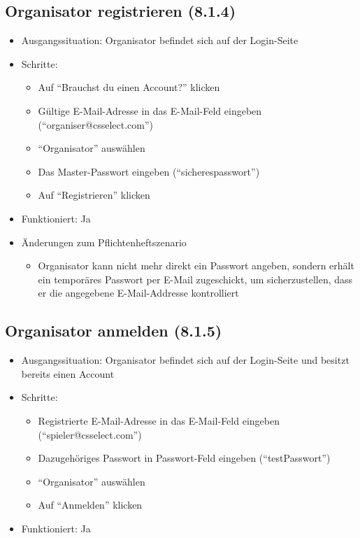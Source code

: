 \documentclass[a4paper]{scrreprt}
\begin{document}
            \subsection{Organisator registrieren (8.1.4)}
            \begin{itemize}
                \item Ausgangssituation: Organisator befindet sich auf der Login-Seite
                \item Schritte:
                    \begin{itemize}
                        \item Auf \enquote{Brauchst du einen Account?} klicken
                        \item Gültige E-Mail-Adresse in das E-Mail-Feld eingeben (\enquote{organiser@csselect.com})
                        \item \enquote{Organisator} auswählen
                        \item Das Master-Passwort eingeben (\enquote{sicherespasswort})
                        \item Auf \enquote{Registrieren} klicken
                    \end{itemize}
                \item Funktioniert: Ja
                \item Änderungen zum Pflichtenheftszenario
                \begin{itemize}
                    \item Organisator kann nicht mehr direkt ein Passwort angeben, sondern erhält ein temporäres Passwort per E-Mail zugeschickt,
                    um sicherzustellen, dass er die angegebene E-Mail-Addresse kontrolliert
                \end{itemize}
            \end{itemize}

            \subsection{Organisator anmelden (8.1.5)}
            \begin{itemize}
                \item Ausgangssituation: Organisator befindet sich auf der Login-Seite und besitzt bereits einen Account
                \item Schritte:
                    \begin{itemize}
                        \item Registrierte E-Mail-Adresse in das E-Mail-Feld eingeben (\enquote{spieler@csselect.com})
                        \item Dazugehöriges Passwort in Passwort-Feld eingeben (\enquote{testPasswort})
                        \item \enquote{Organisator} auswählen
                        \item Auf \enquote{Anmelden} klicken
                    \end{itemize}
                \item Funktioniert: Ja
            \end{itemize}
\end{document}
